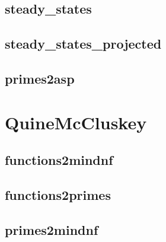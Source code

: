 \documentclass[letterpaper,10pt,english]{sphinxmanual}
\begin{document}
\subsection{steady\_states}
\label{TrapSpaces:steady-states}\label{TrapSpaces:id3}

\subsection{steady\_states\_projected}
\label{TrapSpaces:steady-states-projected}\label{TrapSpaces:id4}

\subsection{primes2asp}
\label{TrapSpaces:id5}\label{TrapSpaces:primes2asp}

\section{QuineMcCluskey}
\label{QuineMcCluskey:quinemccluskey}\label{QuineMcCluskey:networkx-has-path}\label{QuineMcCluskey::doc}\label{QuineMcCluskey:id1}

\subsection{functions2mindnf}
\label{QuineMcCluskey:id2}\label{QuineMcCluskey:functions2mindnf}

\subsection{functions2primes}
\label{QuineMcCluskey:id3}\label{QuineMcCluskey:functions2primes}

\subsection{primes2mindnf}
\label{QuineMcCluskey:id4}\label{QuineMcCluskey:primes2mindnf}
\end{document}
